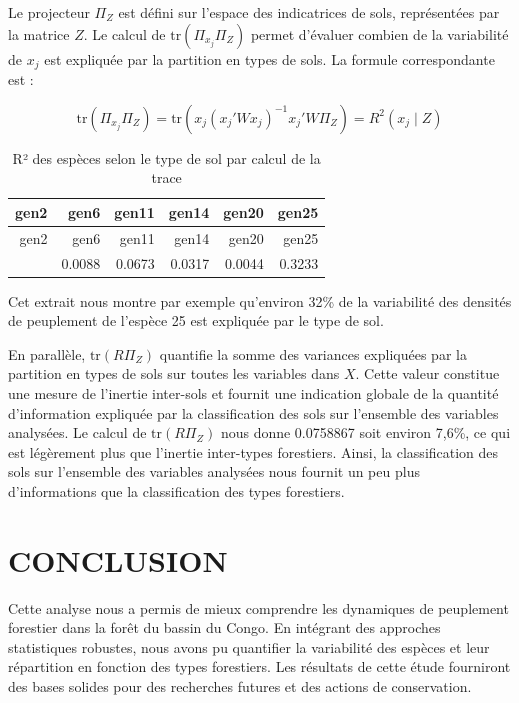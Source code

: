 \documentclass[
]{article}
\begin{document}
Le projecteur \(\Pi_Z\) est défini sur l'espace des indicatrices de
sols, représentées par la matrice \(Z\). Le calcul de
\(\text{tr}(\Pi_{x_j} \Pi_Z)\) permet d'évaluer combien de la
variabilité de \(x_j\) est expliquée par la partition en types de sols.
La formule correspondante est :

\[
\text{tr}(\Pi_{x_j} \Pi_Z) = \text{tr} ({x_j} \left( {x_j}' W {x_j} \right)^{-1} {x_j}' W \Pi_Z) = R^2({x_j} \mid Z)
\]

\begin{longtable}[]{@{}rrrrrr@{}}
\caption{R² des espèces selon le type de sol par calcul de la
trace}\tabularnewline
\toprule\noalign{}
gen2 & gen6 & gen11 & gen14 & gen20 & gen25 \\
\midrule\noalign{}
\endfirsthead
\toprule\noalign{}
gen2 & gen6 & gen11 & gen14 & gen20 & gen25 \\
\midrule\noalign{}
\endhead
\bottomrule\noalign{}
\endlastfoot
0.0175 & 0.0088 & 0.0673 & 0.0317 & 0.0044 & 0.3233 \\
\end{longtable}

Cet extrait nous montre par exemple qu'environ 32\% de la variabilité
des densités de peuplement de l'espèce 25 est expliquée par le type de
sol.

En parallèle, \(\text{tr}(R \Pi_Z)\) quantifie la somme des variances
expliquées par la partition en types de sols sur toutes les variables
dans \(X\). Cette valeur constitue une mesure de l'inertie inter-sols et
fournit une indication globale de la quantité d'information expliquée
par la classification des sols sur l'ensemble des variables analysées.
Le calcul de \(\text{tr}(R \Pi_Z)\) nous donne 0.0758867 soit environ
7,6\%, ce qui est légèrement plus que l'inertie inter-types forestiers.
Ainsi, la classification des sols sur l'ensemble des variables analysées
nous fournit un peu plus d'informations que la classification des types
forestiers.

\hypertarget{conclusion}{%
\section{CONCLUSION}\label{conclusion}}

Cette analyse nous a permis de mieux comprendre les dynamiques de
peuplement forestier dans la forêt du bassin du Congo. En intégrant des
approches statistiques robustes, nous avons pu quantifier la variabilité
des espèces et leur répartition en fonction des types forestiers. Les
résultats de cette étude fourniront des bases solides pour des
recherches futures et des actions de conservation.
\end{document}
